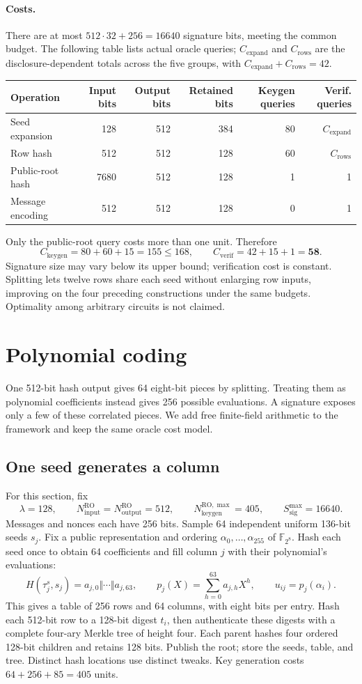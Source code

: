 \documentclass[10pt]{article}
\newcommand{\roinput}{N_{\mathrm{input}}^{\mathrm{RO}}}
\newcommand{\rooutput}{N_{\mathrm{output}}^{\mathrm{RO}}}
\newcommand{\keybudget}{N_{\mathrm{keygen}}^{\mathrm{RO},\max}}
\newcommand{\sigbudget}{S_{\mathrm{sig}}^{\max}}
\begin{document}
\paragraph{Costs.} There are at most $512\cdot32+256=16640$ signature bits, meeting the common budget. The following table lists actual oracle queries; $C_{\mathrm{expand}}$ and $C_{\mathrm{rows}}$ are the disclosure-dependent totals across the five groups, with $C_{\mathrm{expand}}+C_{\mathrm{rows}}=42$.
\begin{center}
\begin{tabular}{lrrrrr}
Operation & Input bits & Output bits & Retained bits & Keygen queries & Verif. queries\\
\hline
Seed expansion & 128 & 512 & 384 & 80 & $C_{\mathrm{expand}}$\\
Row hash & 512 & 512 & 128 & 60 & $C_{\mathrm{rows}}$\\
Public-root hash & 7680 & 512 & 128 & 1 & 1\\
Message encoding & 512 & 512 & 128 & 0 & 1
\end{tabular}
\end{center}
Only the public-root query costs more than one unit. Therefore
\[
 C_{\mathrm{keygen}}=80+60+15=155\le168,\qquad C_{\mathrm{verif}}=42+15+1=\mathbf{58}.
\]
Signature size may vary below its upper bound; verification cost is constant. Splitting lets twelve rows share each seed without enlarging row inputs, improving on the four preceding constructions under the same budgets. Optimality among arbitrary circuits is not claimed.

\clearpage
\section{Polynomial coding}\label{sec:polynomial}
One 512-bit hash output gives 64 eight-bit pieces by splitting. Treating them as polynomial coefficients instead gives 256 possible evaluations. A signature exposes only a few of these correlated pieces. We add free finite-field arithmetic to the framework and keep the same oracle cost model.

\subsection{One seed generates a column}
For this section, fix
\[
 \lambda=128,\qquad \roinput=\rooutput=512,\qquad \keybudget=405,\qquad \sigbudget=16640.
\]
Messages and nonces each have 256 bits. Sample 64 independent uniform 136-bit seeds $s_j$. Fix a public representation and ordering $\alpha_0,\ldots,\alpha_{255}$ of $\mathbb F_{2^8}$. Hash each seed once to obtain 64 coefficients and fill column $j$ with their polynomial's evaluations:
\[
 H(\tau^s_j,s_j)=a_{j,0}\Vert\cdots\Vert a_{j,63},\qquad p_j(X)=\sum_{h=0}^{63}a_{j,h}X^h,\qquad u_{ij}=p_j(\alpha_i).
\]
This gives a table of 256 rows and 64 columns, with eight bits per entry. Hash each 512-bit row to a 128-bit digest $t_i$, then authenticate these digests with a complete four-ary Merkle tree of height four. Each parent hashes four ordered 128-bit children and retains 128 bits. Publish the root; store the seeds, table, and tree. Distinct hash locations use distinct tweaks. Key generation costs $64+256+85=405$ units.
\end{document}
